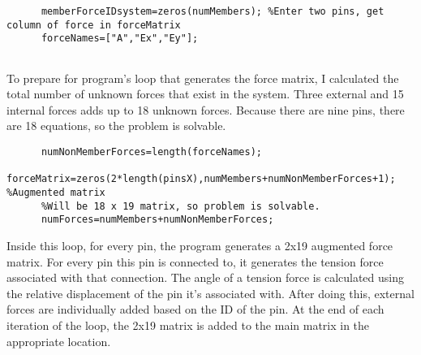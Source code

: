 \documentclass[9pt,letterpaper]{article}
\begin{document}
	  \begin{verbatim}
	  memberForceIDsystem=zeros(numMembers); %Enter two pins, get column of force in forceMatrix
	  forceNames=["A","Ex","Ey"];
	  
	  \end{verbatim}
	  To prepare for program's loop that generates the force matrix, I calculated the total number of unknown forces that exist in the system. Three external and 15 internal forces adds up to 18 unknown forces. Because there are nine pins, there are 18 equations, so the problem is solvable.
	  \begin{verbatim}
	  numNonMemberForces=length(forceNames); 
	  forceMatrix=zeros(2*length(pinsX),numMembers+numNonMemberForces+1); %Augmented matrix
	  %Will be 18 x 19 matrix, so problem is solvable.
	  numForces=numMembers+numNonMemberForces;
	  \end{verbatim}
	  Inside this loop, for every pin, the program generates a 2x19 augmented force matrix. For every pin this pin is connected to, it generates the tension force associated with that connection. The angle of a tension force is calculated using the relative displacement of the pin it's associated with. After doing this, external forces are individually added based on the ID of the pin. At the end of each iteration of the loop, the 2x19 matrix is added to the main matrix in the appropriate location.
\end{document}
